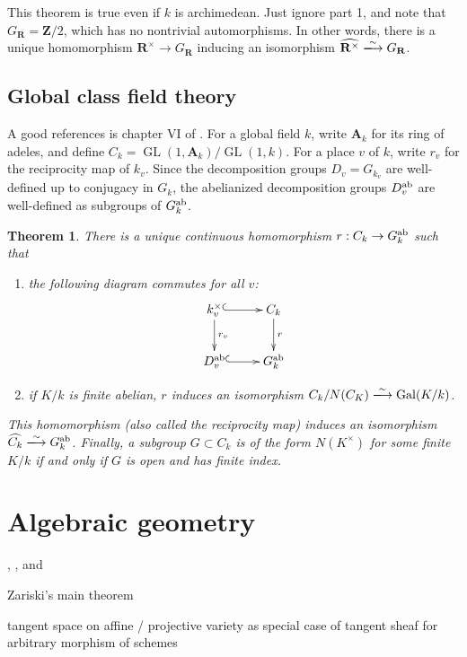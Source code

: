 \documentclass{article}
\DeclareMathOperator{\galois}{Gal}
\DeclareMathOperator{\generallinear}{GL}
\newcommand{\dA}{\mathbf{A}}
\newcommand{\dR}{\mathbf{R}}
\newcommand{\dZ}{\mathbf{Z}}
\newcommand{\abelianize}{\textnormal{ab}}
\newcommand{\isomorphism}{\xlongrightarrow{\sim}}
\newtheorem{theorem}[subsubsection]{Theorem}
\theoremstyle{definition}
\begin{document}
This theorem is true even if $k$ is archimedean. Just ignore part 1, and note 
that $G_\dR=\dZ/2$, which has no nontrivial automorphisms. In other words, 
there is a unique homomorphism $\dR^\times \to G_\dR$ inducing an isomorphism 
$\widehat{\dR^\times}\isomorphism G_\dR$. 


\subsection{Global class field theory}

A good references is chapter VI of \cite{ne99}. For a global field $k$, write 
$\dA_k$ for its ring of adeles, and define 
$C_k=\generallinear(1,\dA_k) / \generallinear(1,k)$. For a place $v$ of $k$, 
write $r_v$ for the reciprocity map of $k_v$. Since the decomposition groups 
$D_v=G_{k_v}$ are well-defined up to conjugacy in $G_k$, the abelianized 
decomposition groups $D_v^\abelianize$ are well-defined as subgroups of 
$G_k^\abelianize$. 

\begin{theorem}
There is a unique continuous homomorphism $r:C_k \to G_k^\abelianize$ such that 
\begin{enumerate}
  \item the following diagram commutes for all $v$:
    \[\xymatrix{
      k_v^\times \ar@{^{(}->}[r] \ar[d]^-{r_v} 
        & C_k \ar[d]^-r \\
      D_v^\abelianize \ar@{^{(}->}[r] 
        & G_k^\abelianize
    }\]
  \item if $K/k$ is finite abelian, $r$ induces an isomorphism 
    $C_k/N(C_K) \isomorphism \galois(K/k)$. 
\end{enumerate}
This homomorphism (also called the \emph{reciprocity map}) induces an 
isomorphism $\widehat{C_k}\isomorphism G_k^\abelianize$. Finally, a subgroup 
$G\subset C_k$ is of the form $N(K^\times)$ for some finite $K/k$ if and only 
if $G$ is open and has finite index. 
\end{theorem}





\section{Algebraic geometry}

\cite{ha77}, \cite{si09}, and \cite{eh00}

Zariski's main theorem

tangent space on affine / projective variety as special case of tangent sheaf 
for arbitrary morphism of schemes
\end{document}
